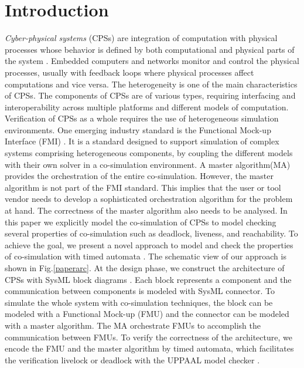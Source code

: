 \section{Introduction}

\textit{Cyber-physical systems} (CPSs)  are integration of computation with physical processes whose behavior is defined by both computational and physical parts of the system \cite{Zanero17}. Embedded computers and networks monitor and control the physical processes, usually with feedback loops where physical processes affect computations and vice versa. The heterogeneity is one of the main characteristics of CPSs. The components of CPSs are of various types, requiring interfacing and interoperability across multiple platforms and different models of computation. Verification of CPSs as a whole requires the use of heterogeneous simulation environments. One emerging industry
standard is the Functional Mock-up Interface (FMI) \cite{Blochwitz2011The}. It
is a standard designed to support simulation of complex systems
comprising heterogeneous components, by coupling the different models with their own solver in a co-simulation environment. A master algorithm(MA)\cite{AckerDVM15} provides the orchestration of the entire co-simulation. However, the master algorithm is not part of the FMI standard. This implies that the user or tool vendor needs to develop a sophisticated orchestration algorithm for the problem at hand. The correctness of the master algorithm also needs to be analysed. In this paper we explicitly model the co-simulation of CPSs to model checking several properties of co-simulation such as deadlock, liveness, and reachability. 
To achieve the goal, we present a novel approach to model and check the properties of co-simulation with timed automata \cite{AlurD94}. The schematic view of our approach is shown in Fig.\ref{paperarc}.
At the design phase, we construct the architecture of CPSs with SysML block diagrams \cite{RahimHI17}. Each block represents a component and the communication between components is modeled with SysML connector. To simulate the whole system with co-simulation techniques, the block can be modeled with a Functional Mock-up  (FMU) and the connector can be modeled with a master algorithm. The MA orchestrate FMUs to accomplish the communication between FMUs. To verify the correctness of the architecture, we encode the FMU and the master algorithm by timed automata, which facilitates the verification livelock or deadlock with the UPPAAL model checker  \cite{BehrmannDLHPYH06}.
